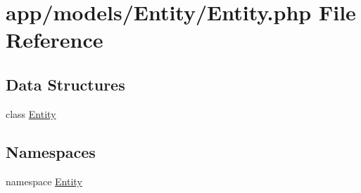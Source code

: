 \hypertarget{models_2_entity_2entity_8php}{\section{app/models/\-Entity/\-Entity.php File Reference}
\label{models_2_entity_2entity_8php}
}
\subsection*{Data Structures}
\begin{DoxyCompactItemize}
\item 
class \hyperlink{class_entity_1_1_entity}{Entity}
\end{DoxyCompactItemize}
\subsection*{Namespaces}
\begin{DoxyCompactItemize}
\item 
namespace \hyperlink{namespace_entity}{Entity}
\end{DoxyCompactItemize}
